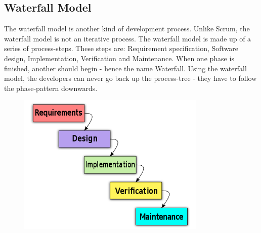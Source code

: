 \subsection{Waterfall Model}

The waterfall model is another kind of development process. Unlike Scrum, the waterfall 
model is not an iterative process.  The waterfall model is made up of a series of 
process-steps. These steps are: Requirement specification, Software design,
Implementation, Verification and Maintenance. When one phase is finished,
another should begin - hence the name Waterfall. Using the waterfall model, 
the developers can never go back up the process-tree - 
they have to follow the phase-pattern downwards\cite{waterfallexplained}.

\begin{figure}[h]
	\centering
		\includegraphics[width=0.8\textwidth]{analysis/waterfall-model.png}
	\label{fig:waterfall-model}
\end{figure}






